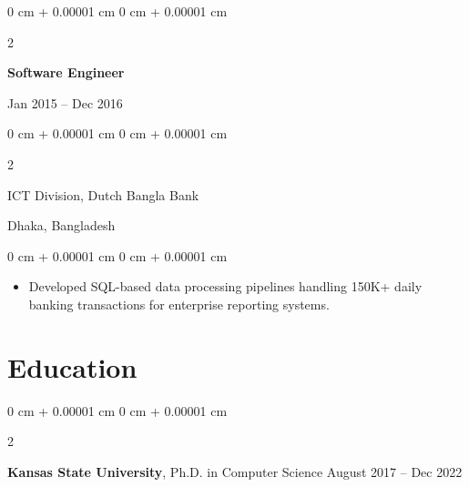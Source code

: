 \documentclass[10pt, letterpaper]{article}
\newenvironment{highlights}{
    \begin{itemize}[
        topsep=0.10 cm,
        parsep=0.10 cm,
        partopsep=0pt,
        itemsep=0pt,
        leftmargin=0 cm + 10pt
    ]
}{
    \end{itemize}
} %
\newenvironment{onecolentry}{
    \begin{adjustwidth}{
        0 cm + 0.00001 cm
    }{
        0 cm + 0.00001 cm
    }
}{
    \end{adjustwidth}
} %
\newenvironment{twocolentry}[2][]{
    \onecolentry
    \def\secondColumn{#2}
    \setcolumnwidth{\fill, 4.5 cm}
    \begin{paracol}{2}
}{
    \switchcolumn \raggedleft \secondColumn
    \end{paracol}
    \endonecolentry
} %
\begin{document}
    \vspace{0.1 cm}
    \begin{twocolentry}{Jan 2015 -- Dec 2016}
        \textbf{Software Engineer}
    \end{twocolentry}
    \begin{twocolentry}{Dhaka, Bangladesh}
       ICT Division, Dutch Bangla Bank
    \end{twocolentry}
    
    \begin{onecolentry}
        \begin{highlights}
            \item Developed SQL-based data processing pipelines handling 150K+ daily banking transactions for enterprise reporting systems.
        \end{highlights}
    \end{onecolentry}
    

\section{Education}
    
        \begin{twocolentry}{
            August 2017 – Dec 2022
        }
            \textbf{Kansas State University}, Ph.D. in Computer Science\end{twocolentry}

\end{document}
